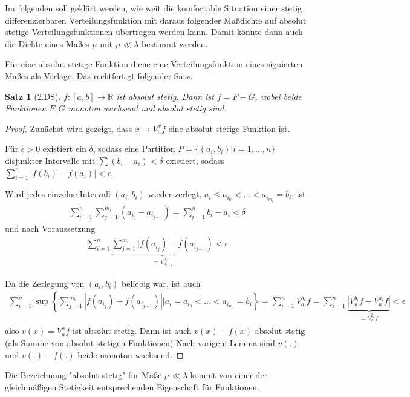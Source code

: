 \documentclass[]{article}
\newtheorem{theorem}{Satz}
\begin{document}
Im folgenden soll geklärt werden, wie weit die komfortable Situation einer stetig differenzierbaren Verteilungsfunktion mit daraus folgender Maßdichte auf absolut stetige Verteilungsfunktionen übertragen werden kann. Damit könnte dann auch die Dichte eines Maßes $\mu$ mit $\mu \ll \lambda$ bestimmt werden.

Für eine absolut stetige Funktion diene eine Verteilungsfunktion eines signierten Maßes als Vorlage. Das rechtfertigt folgender Satz.

\begin{theorem}[2.DS]
	$f:[a,b]\rightarrow\mathbb{R}$ ist absolut stetig. Dann ist $f = F-G$, wobei beide Funktionen $F,G$ monoton wachsend und absolut stetig sind.
\end{theorem}
\begin{proof}
	Zunächst wird gezeigt, dass $x \rightarrow V_a^x f$ eine absolut stetige Funktion ist.
	
	Für $\epsilon > 0$ existiert ein $\delta$, sodass eine Partition $P = \{(a_i,b_i)|i=1,...,n\}$ disjunkter Intervalle mit $\sum (b_i - a_i) < \delta$ existiert, sodass $\sum_{i=1}^{n} |f(b_i) - f(a_i)| < \epsilon$.
	
	Wird jedes einzelne Intervall $(a_i, b_i)$ wieder zerlegt, $a_i \leq a_{i_0} < ... < a_{i_{m_i}} = b_i$, ist
	\begin{align*}
		\sum_{i=1}^{n} \sum_{j=1}^{m_i} (a_{i_j} - a_{i_{j-1}}) = \sum_{i=1}^{n} b_i - a_i < \delta
	\end{align*}
	und nach Voraussetzung
	\begin{align*}
		\sum_{i=1}^{n} \underbrace{\sum_{j=1}^{m_i} |f(a_{i_j}) - f(a_{i_{j-1}})}_{=V_{a_{i-1}}^{a_i}} < \epsilon
	\end{align*}

	Da die Zerlegung von $(a_i,b_i)$ beliebig war, ist auch
	\begin{align*}
		\sum_{i=1}^{n} \sup \left\{\sum_{j=1}^{m_i} |f(a_{i_j}) - f({a_{i_{j-1}}})| \big| a_i = a_{i_0} < ... < a_{i_{m_i}} = b_i\right\} = \sum_{i=1}^{n} V_{a_i}^{b_i} f = \sum_{i=1}^{n} \underbrace{|V_a^{b_i}f - V_a^{a_i} f|}_{=V_{a_i}^{b_i} f} < \epsilon
	\end{align*}
	also $v(x)=V_a^x f$ ist absolut stetig. Dann ist auch $v(x)-f(x)$ absolut stetig (als Summe von absolut stetigen Funktionen) Nach vorigem Lemma sind $v(.)$ und $v(.)-f(.)$ beide monoton wachsend.
\end{proof}

Die Bezeichnung "absolut stetig" für Maße $\mu \ll \lambda$ kommt von einer der gleichmäßigen Stetigkeit entsprechenden Eigenschaft für Funktionen.
\end{document}
